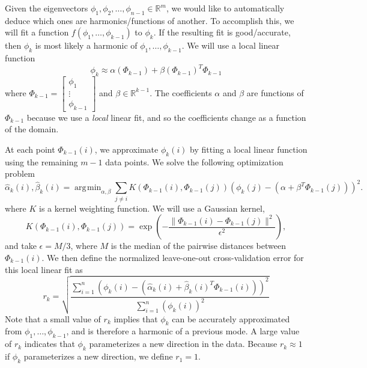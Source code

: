 \documentclass[preprint]{elsarticle}
\DeclareMathOperator*{\argmin}{\arg\!\min}
\begin{document}
Given the eigenvectors $\phi_1, \phi_2, \dots, \phi_{n-1} \in \mathbb{R}^m$, we would like to automatically deduce which ones are harmonics/functions of another. 
%
To accomplish this, we will fit a function $f(\phi_1, \dots, \phi_{k-1})$ to $\phi_{k}$. 
%
If the resulting fit is good/accurate, then $\phi_{k}$ is most likely a harmonic of $\phi_1, \dots, \phi_{k-1}$. 
%
We will use a local linear function 
\begin{equation}
\phi_k \approx \alpha( \Phi_{k-1}) + \beta(\Phi_{k-1})^T \Phi_{k-1}
\end{equation}
where 
%
$\Phi_{k-1} = \begin{bmatrix} \phi_1 \\ \vdots \\ \phi_{k-1} \end{bmatrix}$
and $\beta \in \mathbb{R}^{k-1}$. 
%
The coefficients $\alpha$ and $\beta$ are functions of $\Phi_{k-1}$ because we use a {\em local} linear fit, and so the coefficients change as a function of the domain. 

At each point $\Phi_{k-1}(i)$, we approximate $\phi_k(i)$ by fitting a local linear function using the remaining $m-1$ data points. 
%
We solve the following optimization problem 
\begin{equation} \label{eq:opt_problem}
\hat{\alpha}_k (i) , \hat{\beta}_k(i)  = \argmin_{\alpha, \beta} \sum_{j \ne i} K(\Phi_{k-1}(i), \Phi_{k-1}(j)) \left( \phi_{k}(j) - (\alpha + \beta^T \Phi_{k-1}(j)) \right)^2.
\end{equation}
%
where $K$ is a kernel weighting function.
%
We will use a Gaussian kernel, 
%
\begin{equation}
K(\Phi_{k-1}(i), \Phi_{k-1}(j))  = \exp \left( - \frac{\|\Phi_{k-1}(i) - \Phi_{k-1} (j) \|^2}{\epsilon^2} \right),
\end{equation}
%
and take $\epsilon = M / 3$, where $M$ is the median of the pairwise distances between $\Phi_{k-1}(i)$.
%
We then define the normalized leave-one-out cross-validation error for this local linear fit as
\begin{equation} \label{eq:cv_error}
r_{k} = \sqrt{ \frac{\sum_{i=1}^n \left( \phi_{k} (i) - (\hat{\alpha}_k(i) + \hat{\beta}_k(i)^T \Phi_{k-1}(i))  \right)^2} {\sum_{i=1}^n  \left( \phi_{k} (i) \right)^2 }}
\end{equation}
%
Note that a small value of $r_k$ implies that $\phi_{k}$ can be accurately approximated from $\phi_1, \dots, \phi_{k-1}$, and is therefore a harmonic of a previous mode.
%
A large value of $r_{k}$ indicates that $\phi_{k}$ parameterizes a new direction in the data.
%
Because $r_{k} \approx 1$ if $\phi_{k}$ parameterizes a new direction, we define $r_1 = 1$.
\end{document}
